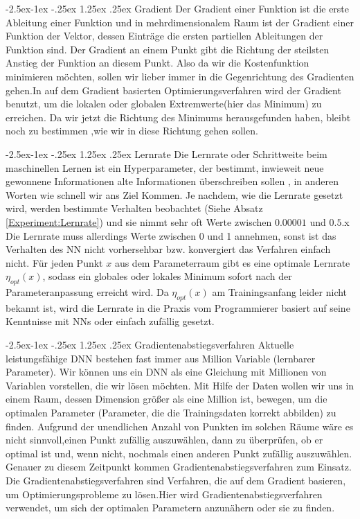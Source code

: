 \documentclass[12pt,a4paper]{scrartcl}
\makeatletter
\numberwithin{equation}{section}
\renewcommand\paragraph{\@startsection{paragraph}{4}{\z@}%
	{-2.5ex\@plus -1ex \@minus -.25ex}%
	{1.25ex \@plus .25ex}%
	{\normalfont\normalsize\bfseries}}
\makeatother
\begin{document}
\paragraph{ Gradient}\label{Gradient}
Der Gradient einer Funktion ist die erste Ableitung einer Funktion und in mehrdimensionalem Raum ist der Gradient einer Funktion der Vektor, dessen Einträge  die ersten partiellen Ableitungen der Funktion sind. Der Gradient an einem Punkt gibt die Richtung der steilsten Anstieg der Funktion an diesem Punkt.  Also da wir die Kostenfunktion minimieren möchten, sollen wir lieber immer in die Gegenrichtung des Gradienten gehen.In auf dem Gradient basierten Optimierungsverfahren wird der Gradient benutzt, um die lokalen oder globalen Extremwerte(hier das Minimum) zu erreichen.
Da wir jetzt die Richtung des Minimums herausgefunden haben, bleibt noch zu bestimmen ,wie wir in diese Richtung gehen  sollen.

\paragraph{Lernrate}\label{Lernrate}
Die Lernrate oder Schrittweite beim maschinellen Lernen ist ein Hyperparameter, der bestimmt, inwieweit neue gewonnene Informationen alte Informationen überschreiben sollen \cite{LearningRate}, in anderen Worten wie schnell wir ans Ziel Kommen.
Je nachdem, wie die Lernrate gesetzt wird, werden bestimmte Verhalten beobachtet (Siehe Absatz \ref{Experiment:Lernrate}) und sie nimmt sehr oft Werte zwischen $ 0.00001 $ und $ 0.5 $.x
Die Lernrate muss allerdings Werte zwischen 0 und 1 annehmen, sonst ist das Verhalten des \ac{NN} nicht vorhersehbar bzw. konvergiert das Verfahren einfach nicht.
Für jeden Punkt $ x $ aus dem Parameterraum gibt es eine optimale Lernrate $ \eta_{opt}(x) $, sodass ein globales oder lokales Minimum sofort nach der Parameteranpassung erreicht wird. Da $ \eta_{opt}(x) $ am Trainingsanfang leider nicht bekannt ist, wird die Lernrate in die Praxis vom Programmierer basiert auf seine Kenntnisse mit \acsp{NN} oder einfach zufällig gesetzt.

\paragraph{Gradientenabstiegsverfahren}\label{Gradientenabstiegsverfahren}
Aktuelle leistungsfähige \ac{DNN} bestehen fast immer aus Million Variable (lernbarer Parameter). Wir können uns ein {DNN} als eine Gleichung mit Millionen von Variablen vorstellen, die wir lösen möchten. Mit Hilfe der Daten wollen wir uns in einem Raum, dessen Dimension größer als eine Million ist, bewegen, um die optimalen Parameter (Parameter, die die Trainingsdaten korrekt abbilden) zu finden. Aufgrund der unendlichen Anzahl von Punkten im solchen Räume wäre es nicht sinnvoll,einen Punkt zufällig auszuwählen, dann zu überprüfen, ob er optimal ist und, wenn nicht, nochmals einen anderen Punkt zufällig auszuwählen. Genauer zu diesem Zeitpunkt kommen Gradientenabstiegsverfahren zum Einsatz.
Die Gradientenabstiegsverfahren sind Verfahren, die auf dem Gradient basieren, um Optimierungsprobleme zu lösen.Hier wird Gradientenabstiegsverfahren verwendet, um sich der optimalen Parametern anzunähern oder sie zu finden.
\end{document}
